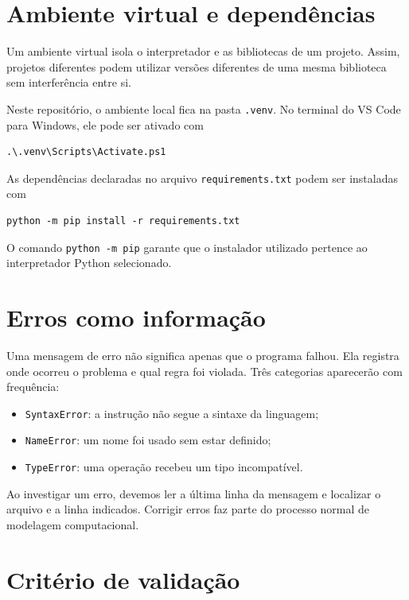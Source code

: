 \section{Ambiente virtual e dependências}

Um ambiente virtual isola o interpretador e as bibliotecas de um projeto. Assim, projetos diferentes podem utilizar versões diferentes de uma mesma biblioteca sem interferência entre si.

Neste repositório, o ambiente local fica na pasta \texttt{.venv}. No terminal do VS Code para Windows, ele pode ser ativado com

\begin{lstlisting}[language={},numbers=none]
.\.venv\Scripts\Activate.ps1
\end{lstlisting}

As dependências declaradas no arquivo \texttt{requirements.txt} podem ser instaladas com

\begin{lstlisting}[language={},numbers=none]
python -m pip install -r requirements.txt
\end{lstlisting}

O comando \texttt{python -m pip} garante que o instalador utilizado pertence ao interpretador Python selecionado.

\section{Erros como informação}

Uma mensagem de erro não significa apenas que o programa falhou. Ela registra onde ocorreu o problema e qual regra foi violada. Três categorias aparecerão com frequência:

\begin{itemize}
  \item \texttt{SyntaxError}: a instrução não segue a sintaxe da linguagem;
  \item \texttt{NameError}: um nome foi usado sem estar definido;
  \item \texttt{TypeError}: uma operação recebeu um tipo incompatível.
\end{itemize}

Ao investigar um erro, devemos ler a última linha da mensagem e localizar o arquivo e a linha indicados. Corrigir erros faz parte do processo normal de modelagem computacional.

\section{Critério de validação}

